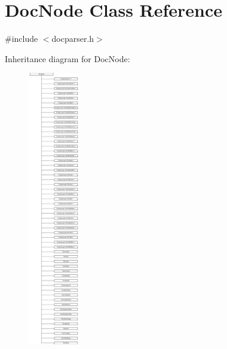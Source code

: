 \hypertarget{class_doc_node}{}\section{Doc\+Node Class Reference}
\label{class_doc_node}


{\ttfamily \#include $<$docparser.\+h$>$}

Inheritance diagram for Doc\+Node\+:\begin{figure}[H]
\begin{center}
\leavevmode
\includegraphics[height=12.000000cm]{class_doc_node}
\end{center}
\end{figure}
